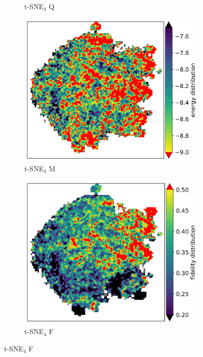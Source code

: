 \documentclass{article} %
\begin{document}
\begin{figure}[ht]
\begin{subfigure}{0.14\textwidth}
        \caption{t-SNE$_4$ Q}
        \label{fig: Prev t-SNE-4 vqe}
    \end{subfigure}
    \begin{subfigure}{0.14\textwidth}
        \centering
        \includegraphics[width=\textwidth]{images/tsqe/maxcut-model-circuits_4_qubits_gsqas_full_embedding_full_embedding_smooth.png}
        \caption{t-SNE$_4$ M}
        \label{fig:Prev t-SNE 4 maxcut}
    \end{subfigure}
    \begin{subfigure}{0.14\textwidth}
        \centering
        \includegraphics[width=\textwidth]{images/tsqe/fidelity-model-circuits_4_qubits_gsqas_full_embedding_full_embedding_smooth.png}
        \caption{t-SNE$_4$ F}
        \label{fig:prev t-sne4 fidelity}
    \end{subfigure}
    

\end{figure}
\end{document}
